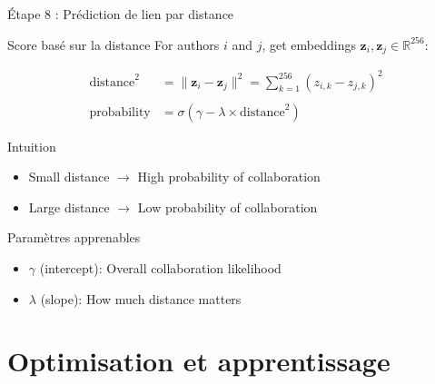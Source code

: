 \documentclass[9pt,aspectratio=169,professionalfonts]{beamer}
\begin{document}
\begin{frame}{Étape 8 : Prédiction de lien par distance}
\begin{block}{Score basé sur la distance}
For authors $i$ and $j$, get embeddings $\mathbf{z}_i, \mathbf{z}_j \in \mathbb{R}^{256}$:

\begin{align}
\text{distance}^2 &= \lVert\mathbf{z}_i - \mathbf{z}_j\rVert^2 = \sum_{k=1}^{256} (z_{i,k} - z_{j,k})^2 \\
\\
\text{probability} &= \sigma(\gamma - \lambda \times \text{distance}^2)
\end{align}
\end{block}

\begin{block}{Intuition}
\begin{itemize}
    \item Small distance $\rightarrow$ High probability of collaboration
    \item Large distance $\rightarrow$ Low probability of collaboration
\end{itemize}
\end{block}

\begin{block}{Paramètres apprenables}
\begin{itemize}
    \item $\gamma$ (intercept): Overall collaboration likelihood
    \item $\lambda$ (slope): How much distance matters
\end{itemize}
\end{block}
\end{frame}

\section{Optimisation et apprentissage}
\end{document}
